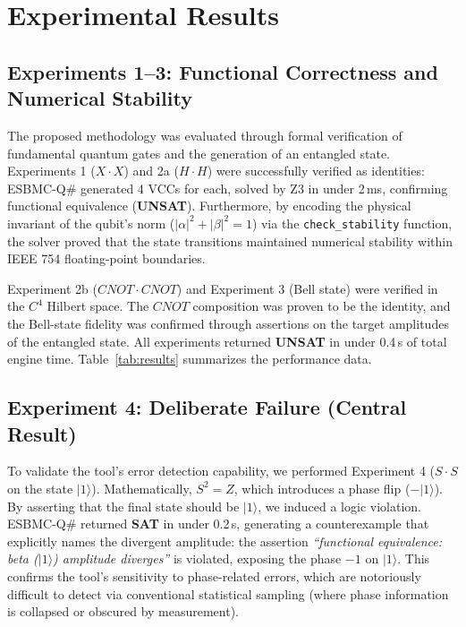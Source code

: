 \documentclass[journal]{IEEEtran} %
\begin{document}
\section{Experimental Results}
\label{sec:results}
\subsection{Experiments 1--3: Functional Correctness and Numerical Stability}
The proposed methodology was evaluated through formal verification of fundamental quantum gates and the generation of an entangled state. Experiments 1 ($X \cdot X$) and 2a ($H \cdot H$) were successfully verified as identities: ESBMC-Q\# generated 4 VCCs for each, solved by Z3 in under 2\,ms, confirming functional equivalence (\textbf{UNSAT}). Furthermore, by encoding the physical invariant of the qubit's norm ($|\alpha|^2 + |\beta|^2 = 1$) via the \texttt{check\_stability} function, the solver proved that the state transitions maintained numerical stability within IEEE 754 floating-point boundaries.

Experiment 2b ($CNOT \cdot CNOT$) and Experiment 3 (Bell state) were verified in the $C^4$ Hilbert space. The $CNOT$ composition was proven to be the identity, and the Bell-state fidelity was confirmed through assertions on the target amplitudes of the entangled state. All experiments returned \textbf{UNSAT} in under 0.4\,s of total engine time. Table~\ref{tab:results} summarizes the performance data.

\subsection{Experiment 4: Deliberate Failure (Central Result)}
To validate the tool's error detection capability, we performed Experiment 4 ($S \cdot S$ on the state $|1\rangle$). Mathematically, $S^2 = Z$, which introduces a phase flip ($-|1\rangle$). By asserting that the final state should be $|1\rangle$, we induced a logic violation. ESBMC-Q\# returned \textbf{SAT} in under 0.2\,s, generating a counterexample that explicitly names the divergent amplitude: the assertion \emph{``functional equivalence: beta ($|1\rangle$) amplitude diverges''} is violated, exposing the phase $-1$ on $|1\rangle$. This confirms the tool's sensitivity to phase-related errors, which are notoriously difficult to detect via conventional statistical sampling (where phase information is collapsed or obscured by measurement).
\end{document}
